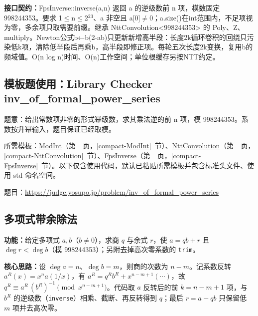 {\sloppy{}\noindent\textbf{接口契约：}FpsInverse::inverse(a,n) 返回 a 的逆级数前 n 项，模数固定 998244353。要求 1$\le$n$\le$2$^{23}$、a 非空且 a[0]$\ne$0；a.size()在int范围内，不足项视为零，多余项只取需要前缀。继承 NttConvolution<998244353> 的 Poly、Z、multiply。Newton公式b←b(2-ab)只更新新增高半段：长度2k循环卷积的回绕只污染低k项，清除低半段后再乘b，高半段即修正项。每轮五次长度2k变换，复用b的频域值。O(n log n)时间、O(n)工作空间；单位根缓存另按NTT约定。\par}



\Needspace{290pt}

\subsection*{模板题使用：Library Checker inv\_of\_formal\_power\_series}

\label{usage-example-18}

题意：给出常数项非零的形式幂级数，求其乘法逆的前 n 项，模 998244353。系数按升幂输入，题目保证已经取模。

所需模板：\hyperref[compact-ModInt]{ModInt}（第~\pageref{compact-ModInt}~页，\ref{compact-ModInt}~节）、\hyperref[compact-NttConvolution]{NttConvolution}（第~\pageref{compact-NttConvolution}~页，\ref{compact-NttConvolution}~节）、\hyperref[compact-FpsInverse]{FpsInverse}（第~\pageref{compact-FpsInverse}~页，\ref{compact-FpsInverse}~节）。以下仅含使用代码，默认已粘贴所需模板并包含标准头文件、使用 std 命名空间。

题目：\url{https://judge.yosupo.jp/problem/inv_of_formal_power_series}



\Needspace{523pt}

\subsection{多项式带余除法}\label{compact-PolynomialDivision}

\noindent\textbf{功能：}\allowbreak 给定多项式 $a,b$（$b\ne0$），求商 $q$ 与余式 $r$，使 $a=qb+r$ 且 $\deg r<\deg b$（模 998244353）；另附去掉高次零系数的 \texttt{trim}。

\textbf{核心思路：}\allowbreak 设 $\deg a=n$、$\deg b=m$，则商的次数为 $n-m$。记系数反转 $a^R(x)=x^na(1/x)$，有 $a^R=q^Rb^R+x^{n-m+1}(\cdots)$，故 $q^R\equiv a^R\,(b^R)^{-1}\pmod{x^{n-m+1}}$。代码取 $a$ 反转后的前 $k=n-m+1$ 项，与 $b^R$ 的逆级数（\texttt{inverse}）相乘、截断、再反转得到 $q$；最后 $r=a-qb$ 只保留低 $m$ 项并去高次零。

